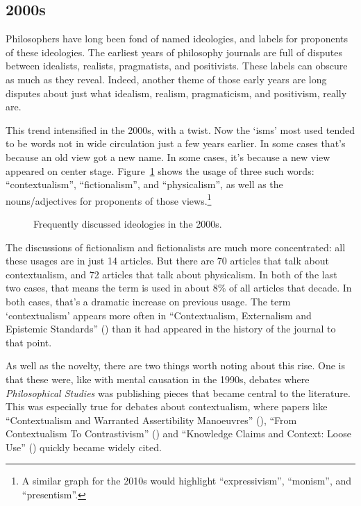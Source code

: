 \documentclass[
  10pt,
  letterpaper,
  DIV=11,
  numbers=noendperiod,
  twoside]{scrartcl}
\begin{document}
\subsection{2000s}\label{sec-2000s-articles}

Philosophers have long been fond of named ideologies, and labels for
proponents of these ideologies. The earliest years of philosophy
journals are full of disputes between idealists, realists, pragmatists,
and positivists. These labels can obscure as much as they reveal.
Indeed, another theme of those early years are long disputes about just
what idealism, realism, pragmaticism, and positivism, really are.

This trend intensified in the 2000s, with a twist. Now the `isms' most
used tended to be words not in wide circulation just a few years
earlier. In some cases that's because an old view got a new name. In
some cases, it's because a new view appeared on center stage.
Figure~\ref{fig-2000s-isms} shows the usage of three such words:
``contextualism'', ``fictionalism'', and ``physicalism'', as well as the
nouns/adjectives for proponents of those views.\footnote{A similar graph
  for the 2010s would highlight ``expressivism'', ``monism'', and
  ``presentism''.}

\begin{figure}


\caption{\label{fig-2000s-isms}Frequently discussed ideologies in the
2000s.}

\end{figure}%

The discussions of fictionalism and fictionalists are much more
concentrated: all these usages are in just 14 articles. But there are 70
articles that talk about contextualism, and 72 articles that talk about
physicalism. In both of the last two cases, that means the term is used
in about 8\% of all articles that decade. In both cases, that's a
dramatic increase on previous usage. The term `contextualism' appears
more often in ``Contextualism, Externalism and Epistemic Standards''
() than it had appeared
in the history of the journal to that point.

As well as the novelty, there are two things worth noting about this
rise. One is that these were, like with mental causation in the 1990s,
debates where \emph{Philosophical Studies} was publishing pieces that
became central to the literature. This was especially true for debates
about contextualism, where papers like ``Contextualism and Warranted
Assertibility Manoeuvres'' (), ``From Contextualism To Contrastivism''
() and ``Knowledge
Claims and Context: Loose Use'' () quickly became widely cited.
\end{document}
